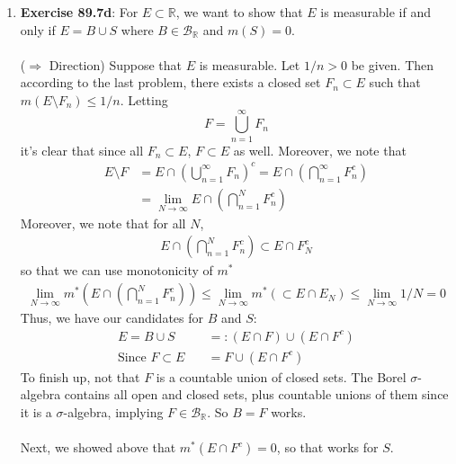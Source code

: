 \documentclass[12pt]{article}
\theoremstyle{plain}
\theoremstyle{definition}
\theoremstyle{remark}
\begin{document}
\begin{enumerate}
\begin{enumerate}
\item \textbf{Exercise 89.7d}: For $E\subset\mathbb{R}$, we want to show that $E$ is measurable if and only if $E = B\cup S$ where $B\in\mathscr{B}_\mathbb{R}$ and $m(S)=0$.
\\
\\
($\Rightarrow$ Direction) Suppose that $E$ is measurable. Let $1/n>0$ be given. Then according to the last problem, there exists a closed set $F_n\subset E$ such that $m(E\setminus F_n) \leq 1/n$. Letting
\[
    F = \bigcup^\infty_{n=1} F_n 
\]
it's clear that since all $F_n\subset E$, $F\subset E$ as well. Moreover, we note that
\begin{align*}
    E\setminus F &= E\cap \left(\bigcup^\infty_{n=1} F_n\right)^c  
    = E\cap \left(\bigcap^\infty_{n=1} F_n^c\right) \\
    &= \lim_{N\rightarrow\infty}
        E\cap \left(\bigcap^N_{n=1} F_n^c\right) 
\end{align*}
Moreover, we note that for all $N$,
\begin{align*}
    E\cap \left(\bigcap^N_{n=1} F_n^c\right) 
    \subset E \cap F^c_N
\end{align*}
so that we can use monotonicity of $m^*$
\begin{align*}
    \lim_{N\rightarrow\infty} 
    m^*\left(E\cap \left(\bigcap^N_{n=1} F_n^c\right) 
   \right)  \leq
    \lim_{N\rightarrow\infty} 
    m^*\left(\subset E \cap E_N\right) 
    \leq \lim_{N\rightarrow\infty} 1/N = 0
\end{align*}
Thus, we have our candidates for $B$ and $S$:
\begin{align*}
    E = B \cup S &=: (E \cap F) \cup (E\cap F^c)  \\
    \text{Since $F\subset E$} \quad &= F \cup (E\cap F^c)
\end{align*}
To finish up, not that $F$ is a countable union of closed sets. The Borel $\sigma$-algebra contains all open and closed sets, plus countable unions of them since it is a $\sigma$-algebra, implying $F\in\mathscr{B}_\mathbb{R}$. So $B=F$ works.
\\
\\
Next, we showed above that $m^*(E\cap F^c)=0$, so that works for $S$.




\end{enumerate}



\end{enumerate}
\end{document}
